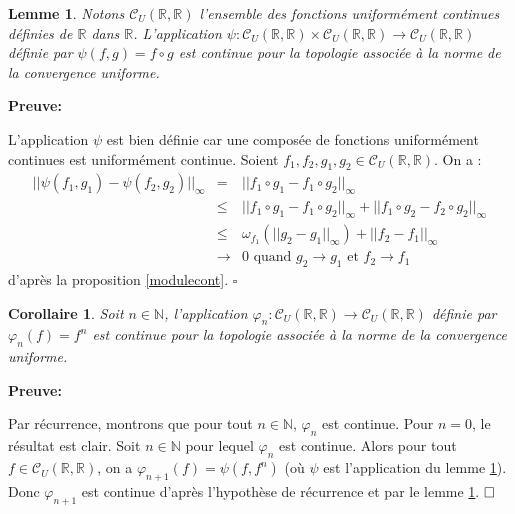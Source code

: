 \documentclass[11pt,a4 paper]{article}
\newtheorem{lemme}[theoreme]{Lemme}
\newtheorem{corollaire}[theoreme]{Corollaire}
\newcommand{\Rbb}{\mathbb{R}}
\newcommand{\Cc}{\mathcal{C}}
\newenvironment{coro}{\begin{box_coro}\begin{corollaire}}{\end{corollaire}\end{box_coro}}
\newenvironment{lm}{\begin{box_lm}\begin{lemme}}{\end{lemme}\end{box_lm}}
\begin{document}
\begin{lm}\label{psi}
	Notons $\Cc_U(\mathbb{R},\mathbb{R})$ l'ensemble des fonctions uniformément continues définies de $\mathbb{R}$ dans $\Rbb$. L'application $\psi: \Cc_U(\mathbb{R},\mathbb{R}) \times \Cc_U(\mathbb{R},\mathbb{R}) \to \Cc_U(\mathbb{R},\mathbb{R})$ définie par $\psi(f,g)=f\circ g$ est continue pour la topologie associée à la norme de la convergence uniforme.
\end{lm}

	\textbf{Preuve:}
	\par L'application $\psi$ est bien définie car une composée de fonctions uniformément continues est uniformément continue. Soient $f_1, f_2, g_1, g_2 \in \Cc_U(\mathbb{R},\mathbb{R})$. On a :
	\begin{eqnarray*}
	||\psi(f_1,g_1) -\psi(f_2,g_2)||_{\infty}&=& ||f_1\circ g_1 - f_1 \circ g_2||_{\infty}\\
		&\leq& ||f_1\circ g_1 - f_1\circ g_2||_{\infty} +||f_1\circ g_2	- f_2 \circ g_2||_{\infty} \\
		&\leq& \omega_{f_1}(||g_2 - g_1||_{\infty}) + ||f_2 - f_1||_{\infty} \\
		&\longrightarrow& 0 \text{ quand } g_2 \to g_1 \text{ et } f_2 \to f_1
	\end{eqnarray*}
d'après la proposition \ref{modulecont}. $\square$\\






\begin{coro}\label{phin}
	Soit $n \in \mathbb{N}$, l'application  $\varphi_n : \Cc_U(\mathbb{R},\mathbb{R}) \to \Cc_U(\mathbb{R},\mathbb{R})$ définie par $\varphi_n(f)=f^n$ est continue pour la topologie associée à la norme de la convergence uniforme.
\end{coro}

	\textbf{Preuve:}
		\par Par récurrence, montrons que pour tout $n \in \mathbb{N}$, $\varphi_n $ est continue. Pour $n=0$, le résultat est clair. Soit $n \in \mathbb{N}$ pour lequel $\varphi_n$ est continue. Alors pour tout $f \in  \Cc_U(\mathbb{R},\mathbb{R})$, on a $\varphi_{n+1}(f)= \psi(f,f^n)$ (où $\psi$ est l'application du lemme \ref{psi}). Donc $\varphi_{n+1}$ est continue d'après l'hypothèse de récurrence et par le lemme \ref{psi}. $\hfill \square$ \\
	
\end{document}
